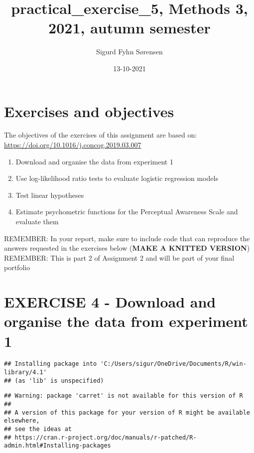 \documentclass[
]{article}
\title{practical\_exercise\_5, Methods 3, 2021, autumn semester}
\author{Sigurd Fyhn Sørensen}
\date{13-10-2021}
\providecommand{\tightlist}{%
  \setlength{\itemsep}{0pt}\setlength{\parskip}{0pt}}
\begin{document}
\maketitle

\hypertarget{exercises-and-objectives}{%
\section{Exercises and objectives}\label{exercises-and-objectives}}

The objectives of the exercises of this assignment are based on:
\url{https://doi.org/10.1016/j.concog.2019.03.007}

\begin{enumerate}
\def\labelenumi{\arabic{enumi})}
\setcounter{enumi}{3}
\tightlist
\item
  Download and organise the data from experiment 1\\
\item
  Use log-likelihood ratio tests to evaluate logistic regression
  models\\
\item
  Test linear hypotheses\\
\item
  Estimate psychometric functions for the Perceptual Awareness Scale and
  evaluate them
\end{enumerate}

REMEMBER: In your report, make sure to include code that can reproduce
the answers requested in the exercises below (\textbf{MAKE A KNITTED
VERSION})\\
REMEMBER: This is part 2 of Assignment 2 and will be part of your final
portfolio

\hypertarget{exercise-4---download-and-organise-the-data-from-experiment-1}{%
\section{EXERCISE 4 - Download and organise the data from experiment
1}\label{exercise-4---download-and-organise-the-data-from-experiment-1}}

\begin{verbatim}
## Installing package into 'C:/Users/sigur/OneDrive/Documents/R/win-library/4.1'
## (as 'lib' is unspecified)
\end{verbatim}

\begin{verbatim}
## Warning: package 'carret' is not available for this version of R
## 
## A version of this package for your version of R might be available elsewhere,
## see the ideas at
## https://cran.r-project.org/doc/manuals/r-patched/R-admin.html#Installing-packages
\end{verbatim}
\end{document}
